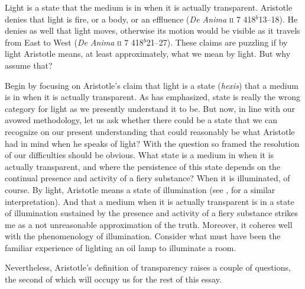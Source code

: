 \documentclass[12pt]{article}
\begin{document}
Light is a state that the medium is in when it is actually transparent. Aristotle denies that light is fire, or a body, or an effluence (\emph{De Anima} \textsc{ii} 7 418\( ^{b} \)13--18). He denies as well that light moves, otherwise its motion would be visible as it travels from East to West (\emph{De Anima} \textsc{ii} 7 418\( ^{b} \)21--27). These claims are puzzling if by light Aristotle means, at least approximately, what we mean by light. But why assume that? 

Begin by focusing on Aristotle's claim that light is a state (\emph{hexis}) that a medium is in when it is actually transparent. As \citet{Burnyeat:1995fk} has emphasized, state is really the wrong category for light as we presently understand it to be. But now, in line with our avowed methodology, let us ask whether there could be a state that we can recognize on our present understanding that could reasonably be what Aristotle had in mind when he speaks of light? With the question so framed the resolution of our difficulties should be obvious. What state is a medium in when it is actually transparent, and where the persistence of this state depends on the continual presence and activity of a fiery substance? When it is illuminated, of course. By light, Aristotle means a state of illumination (see \citealt[122]{Thorp:1982fk}, for a similar interpretation). And that a medium when it is actually transparent is in a state of illumination sustained by the presence and activity of a fiery substance strikes me as a not unreasonable approximation of the truth. Moreover, it coheres well with the phenomenology of illumination. Consider what must have been the familiar experience of lighting an oil lamp to illuminate a room.

Nevertheless, Aristotle's definition of transparency raises a couple of questions, the second of which will occupy us for the rest of this essay.
\end{document}
